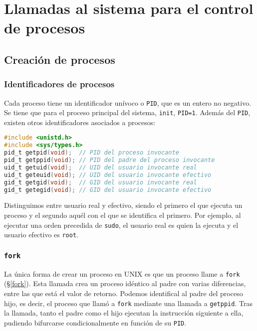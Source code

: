 \section{Llamadas al sistema para el control de procesos}

\subsection{Creación de procesos}

\subsubsection{Identificadores de procesos}

Cada proceso tiene un identificador unívoco o \texttt{PID}, que es un entero no negativo.
Se tiene que para el proceso principal del sistema, \texttt{init}, \texttt{PID=1}.
Además del \texttt{PID}, existen otros identificadores asociados a procesos:

\begin{lstlisting}[language=C]
#include <unistd.h>
#include <sys/types.h>
pid_t getpid(void);  // PID del proceso invocante
pid_t getppid(void); // PID del padre del proceso invocante
uid_t getuid(void);  // UID del usuario invocante real
uid_t geteuid(void); // UID del usuario invocante efectivo
gid_t getgid(void);  // GID del usuario invocante real
gid_t getegid(void); // GID del usuario invocante efectivo
\end{lstlisting}

Distinguimos entre usuario real y efectivo, siendo el primero el que ejecuta un proceso y el segundo aquél con el que se identifica el primero.
Por ejemplo, al ejecutar una orden precedida de \texttt{sudo}, el usuario real es quien la ejecuta y el usuario efectivo es \texttt{root}.

\subsubsection{\texttt{fork}}

La única forma de crear un proceso en UNIX es que un proceso llame a \texttt{fork} (\S\ref{fork}).
Esta llamada crea un proceso idéntico al padre con varias diferencias, entre las que está el valor de retorno.
Podemos identifical al padre del proceso hijo, es decir, el proceso que llamó a \texttt{fork} mediante una llamada a \texttt{getppid}.
Tras la llamada, tanto el padre como el hijo ejecutan la instrucción siguiente a ella, pudiendo bifurcarse condicionalmente en función de su \texttt{PID}.

